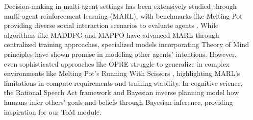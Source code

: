 \documentclass{article} %
\begin{document}
Decision-making in multi-agent settings has been extensively studied through multi-agent reinforcement learning (MARL), with benchmarks like Melting Pot providing diverse social interaction scenarios to evaluate agents \citep{agapiou2022melting}. While algorithms like MADDPG \citep{lowe2017multi} and MAPPO \citep{yu2022surprising} have advanced MARL through centralized training approaches, specialized models incorporating Theory of Mind principles \citep{rabinowitz2018machine,wang2021tom2c,yu2022model,huh2024representation,vezhnevets2020options,sclar2022symmetric} have shown promise in modeling other agents' intentions. However, even sophisticated approaches like OPRE \citep{vezhnevets2020options} struggle to generalize in complex environments like Melting Pot's Running With Scissors \citep{agapiou2022melting}, highlighting MARL's limitations in compute requirements and training stability. In cognitive science, the Rational Speech Act framework \citep{goodman2016pragmatic} and Bayesian inverse planning \citep{baker2009action} model how humans infer others' goals and beliefs through Bayesian inference, providing inspiration for our ToM module.


\end{document}
